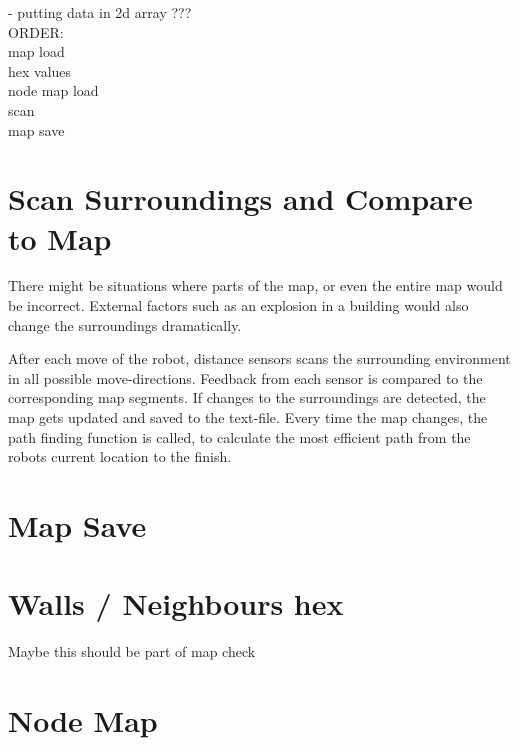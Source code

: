 - putting data in 2d array ???\\

ORDER:\\
map load\\
hex values\\
node map load\\
scan\\
map save

\section{Scan Surroundings and Compare to Map}
\label{sec:map_check} %
There might be situations where parts of the map, or even the entire map would be incorrect.
External factors such as an explosion in a building would also change the surroundings dramatically.
 
After each move of the robot, distance sensors scans the surrounding environment in all possible move-directions.
Feedback from each sensor is compared to the corresponding map segments. 
If changes to the surroundings are detected, the map gets updated and saved to the text-file.
Every time the map changes, the path finding function is called, to calculate the most efficient path from the robots current location to the finish. 



\section{Map Save}
\label{sec:map_save} %

\section{Walls / Neighbours hex}
\label{sec:map_hex} %
Maybe this should be part of map check

\section{Node Map}
\label{sec:map_node} %



